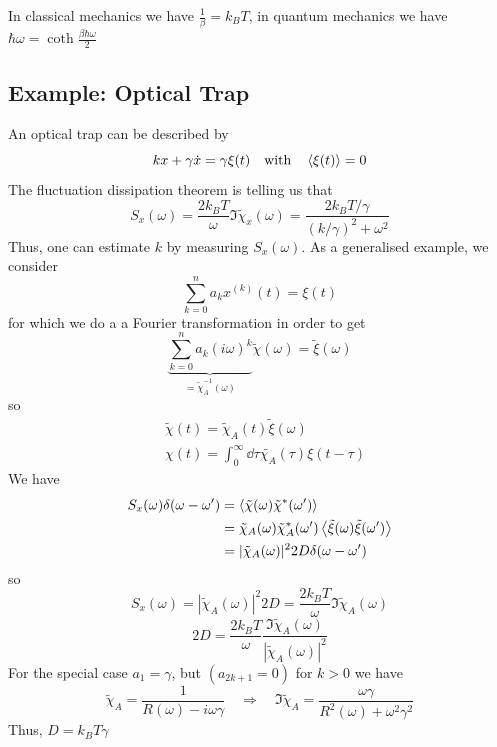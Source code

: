 \documentclass{/home/ben/Templates/notebook}
\begin{document}
	In classical mechanics we have $\frac{1}{\beta} = k_B T$, in quantum mechanics we have $\hbar \omega = \coth \frac{\beta \hbar \omega}{2}$
	
	\subsection*{Example: Optical Trap}
	
	An optical trap can be described by 
	\begin{equation}
	k x + \gamma \dot{x} = \gamma \xi(t) \quad \mathrm{with} \quad \expval{\xi(t)} = 0
	\end{equation}
	The fluctuation dissipation theorem is telling us that
	\begin{equation}
	S_x(\omega) = \frac{2 k_B T}{\omega} \Im \tilde{\chi}_x(\omega) = \frac{2 k_B T / \gamma}{(k/\gamma)^2 + \omega^2}
	\end{equation}
	Thus, one can  estimate $k$ by measuring $S_x(\omega)$. As a generalised example, we consider
	\begin{equation}
	\sum_{k = 0}^n a_k x^{(k)}(t) = \xi(t)
	\end{equation}
	for which we do a a Fourier transformation in order to get
	\begin{equation}
	\underbrace{\sum_{k = 0}^n a_k (i \omega)^k}_{= \tilde{\chi}^{-1}_A(\omega)} \tilde{\chi}(\omega) = \tilde{\xi}(\omega)
	\end{equation}
	so
	\begin{align*}
		& \tilde{\chi}(t) = \tilde{\chi}_A(t) \tilde{\xi}(\omega) \\
		& \chi(t) = \int_0^{\infty} \dd{\tau} \tilde{\chi_A}(\tau) \xi(t-\tau)
	\end{align*}
	We have
	\begin{align*}
		S_x(\omega) \delta(\omega - \omega') &= \expval{\tilde{\chi}(\omega)\tilde{\chi}^*(\omega')} \\ 
		&= \tilde{\chi}_A(\omega) \tilde{\chi}^*_A(\omega') \expval{\tilde{\xi}(\omega) \tilde{\xi}(\omega')} \\
		&= |\tilde{\chi}_A(\omega)|^2 2D \delta(\omega - \omega')
	\end{align*}
	so 
	\begin{equation}
	S_x(\omega) = |\tilde{\chi}_A(\omega)|^2 2D = \frac{2 k_B T}{\omega} \Im \tilde{\chi}_A(\omega)
	\end{equation}
	\begin{equation}
	2D = \frac{2 k_B T}{\omega} \frac{\Im \tilde{\chi}_A(\omega)}{|\tilde{\chi}_A(\omega)|^2}
	\end{equation}
	For the special case $a_1 = \gamma$, but $(a_{2k+1} = 0)$ for $k > 0$ we have
	\begin{equation}
	\tilde{\chi}_A = \frac{1}{R(\omega) - i \omega \gamma} \quad \Rightarrow \quad \Im \tilde{\chi}_A = \frac{\omega \gamma}{R^2(\omega) + \omega^2 \gamma^2}
	\end{equation}
	Thus, $D = k_B T \gamma$
	
\end{document}
